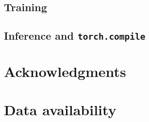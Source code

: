 \documentclass[fleqn,12pt]{wlscirep}
\begin{document}

\subsection{Training}


\subsection{Inference and \texttt{torch.compile}}


\section{Acknowledgments}


\section{Data availability}

\end{document}
